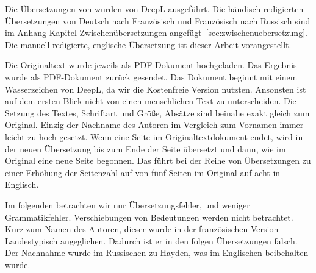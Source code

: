Die Übersetzungen von wurden von DeepL ausgeführt. Die händisch redigierten Übersetzungen von Deutsch nach Französisch und Französisch nach Russisch sind im Anhang Kapitel Zwischenübersetzungen angefügt~\ref{sec:zwischenuebersetzung}. Die manuell redigierte, englische Übersetzung ist dieser Arbeit vorangestellt. 

Die Originaltext wurde jeweils als PDF-Dokument hochgeladen. Das Ergebnis wurde als PDF-Dokument zurück gesendet. Das Dokument beginnt mit einem Wasserzeichen von DeepL, da wir die Kostenfreie Version nutzten.
Ansonsten ist auf dem ersten Blick nicht von einen menschlichen Text zu unterscheiden. Die Setzung des Textes, Schriftart und Größe, Absätze sind beinahe exakt gleich zum Original.
Einzig der Nachname des Autoren im Vergleich zum Vornamen immer leicht zu hoch gesetzt. Wenn eine Seite im Originaltextdokument endet, wird in der neuen Übersetzung bis zum Ende der Seite übersetzt und dann, wie im Original eine neue Seite begonnen. Das führt bei der Reihe von Übersetzungen zu einer Erhöhung der Seitenzahl auf von fünf Seiten im Original auf acht in Englisch.

Im folgenden betrachten wir nur Übersetzungsfehler, und weniger Grammatikfehler. Verschiebungen von Bedeutungen werden nicht betrachtet. Kurz zum Namen des Autoren, dieser wurde in der französischen Version Landestypisch angeglichen. Dadurch ist er in den folgen Übersetzungen falsch. Der Nachnahme wurde im Russischen zu Hayden, was im Englischen beibehalten wurde.